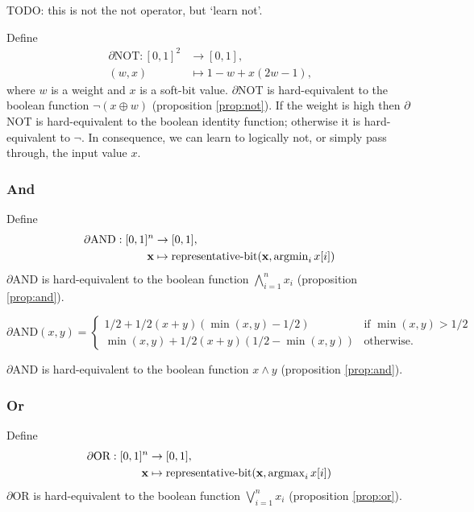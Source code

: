 \documentclass{article} %
\begin{document}
TODO: this is not the not operator, but `learn not'.

Define
	\begin{equation*}
	\begin{aligned}
	\partial\text{NOT}: [0, 1]^{2} &\to [0,1], \\
	(w, x) &\mapsto 1 - w + x (2w - 1)\text{,}
	\end{aligned}
	\end{equation*}
where $w$ is a weight and $x$ is a soft-bit value.
$\partial${NOT} is hard-equivalent to the boolean function $\neg(x \oplus w)$ (proposition \ref{prop:not}). If the weight is high then $\partial${NOT} is hard-equivalent to the boolean identity function; otherwise it is hard-equivalent to $\neg$. In consequence, we can learn to logically not, or simply pass through, the input value $x$.


\subsubsection{And}

Define
\begin{equation*}
\begin{aligned}
\partial\text{AND}: [0,1]^{n} &\to [0,1], \\
{\bf x} &\mapsto \operatorname{representative-bit}({\bf x}, \operatorname{argmin}\limits_{i} x[i])
\end{aligned}
\end{equation*}
$\partial${AND} is hard-equivalent to the boolean function $\bigwedge_{i=1}^{n} x_i$ (proposition \ref{prop:and}).

\begin{equation*}
\partial\text{AND}(x, y) =
	\begin{cases}
	1/2 + 1/2(x + y)(\operatorname{min}(x,y) - 1/2) & \text{if } \operatorname{min}(x,y) > 1/2 \\
	\operatorname{min}(x,y) + 1/2(x + y)(1/2 - \operatorname{min}(x,y)) & \text{otherwise.}
	\end{cases}
\end{equation*}

$\partial${AND} is hard-equivalent to the boolean function $x \wedge y$ (proposition \ref{prop:and}).


\subsubsection{Or}

Define
\begin{equation*}
\begin{aligned}
\partial\text{OR}: [0,1]^{n} &\to [0,1], \\
{\bf x} &\mapsto \operatorname{representative-bit}({\bf x}, \operatorname{argmax}\limits_{i} x[i])
\end{aligned}
\end{equation*}
$\partial${OR} is hard-equivalent to the boolean function $\bigvee_{i=1}^{n} x_i$ (proposition \ref{prop:or}).
\end{document}
